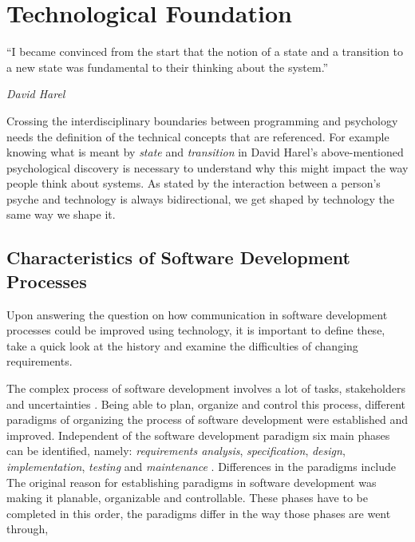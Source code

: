 \chapter{Technological Foundation}
\label{chap:technological-foundation}
\noindent
\epigraph{``I became convinced from the start that the notion of a state and a transition to a new state was fundamental to their thinking about the system.''}{\textit{David Harel}}
Crossing the interdisciplinary boundaries between programming and psychology needs the definition of the technical concepts that are referenced.
For example knowing what is meant by \emph{state} and \emph{transition} in David Harel's above-mentioned psychological discovery is necessary to understand why this might impact the way people think about systems. 
As stated by \textcite{schraube_ich_2012} the interaction between a person's psyche and technology is always bidirectional, we get shaped by technology the same way we shape it.

\section{Characteristics of Software Development Processes}
\label{sec:characteristics-of-software-development-processes}
Upon answering the question on how communication in software development processes could be improved using technology, it is important to define these, take a quick look at the history and examine the difficulties of changing requirements.

The complex process of software development involves a lot of tasks, stakeholders and uncertainties \autocite{mayr_projekt_2005}.
Being able to plan, organize and control this process, different paradigms of organizing the process of software development were established and improved.
Independent of the software development paradigm six main phases can be identified, namely: \emph{requirements analysis}, \emph{specification}, \emph{design}, \emph{implementation}, \emph{testing} and \emph{maintenance} \autocite{harel_statecharts:_1987}.
Differences in the paradigms include 
The original reason for establishing paradigms in software development was making it planable, organizable and controllable.
These phases have to be completed in this order, the paradigms differ in the way those phases are went through, 



